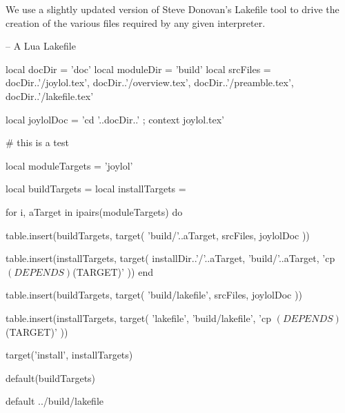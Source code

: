 
\startchapter[title=Lakefile]

We use a slightly updated version of Steve Donovan's Lakefile tool to 
drive the creation of the various files required by any given 
 interpreter. 

\startLakefile
-- A Lua Lakefile

local docDir    = 'doc'
local moduleDir = 'build'
local srcFiles = {
  docDir..'/joylol.tex',
  docDir..'/overview.tex',
  docDir..'/preamble.tex',
  docDir..'/lakefile.tex'
}

local joylolDoc = 
  'cd '..docDir..' ; context joylol.tex'

# this is a test
  
local moduleTargets = {
  'joylol'
}

local buildTargets   = { }
local installTargets = { }

for i, aTarget in ipairs(moduleTargets) do

  table.insert(buildTargets, target(
    'build/'..aTarget,
    srcFiles,
    joylolDoc
  ))

  table.insert(installTargets, target(
    installDir..'/'..aTarget,
    'build/'..aTarget,
    'cp $(DEPENDS) $(TARGET)'
  ))
end

table.insert(buildTargets, target(
  'build/lakefile',
  srcFiles,
  joylolDoc
))

table.insert(installTargets, target(
  'lakefile',
  'build/lakefile',
  'cp $(DEPENDS) $(TARGET)'
))

target('install', installTargets)

default(buildTargets)
\stopLakefile

\createLakefileFile%
  {default}%
  {../build/lakefile}%
  {}

\stopchapter